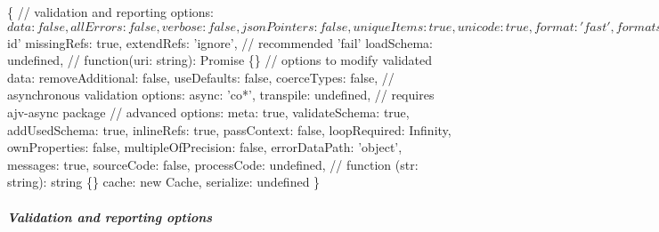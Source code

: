 \begin{DoxyCode}
\{
  // validation and reporting options:
  $data:            false,
  allErrors:        false,
  verbose:          false,
  jsonPointers:     false,
  uniqueItems:      true,
  unicode:          true,
  format:           'fast',
  formats:          \{\},
  unknownFormats:   true,
  schemas:          \{\},
  // referenced schema options:
  schemaId:         undefined // recommended '$id'
  missingRefs:      true,
  extendRefs:       'ignore', // recommended 'fail'
  loadSchema:       undefined, // function(uri: string): Promise \{\}
  // options to modify validated data:
  removeAdditional: false,
  useDefaults:      false,
  coerceTypes:      false,
  // asynchronous validation options:
  async:            'co*',
  transpile:        undefined, // requires ajv-async package
  // advanced options:
  meta:             true,
  validateSchema:   true,
  addUsedSchema:    true,
  inlineRefs:       true,
  passContext:      false,
  loopRequired:     Infinity,
  ownProperties:    false,
  multipleOfPrecision: false,
  errorDataPath:    'object',
  messages:         true,
  sourceCode:       false,
  processCode:      undefined, // function (str: string): string \{\}
  cache:            new Cache,
  serialize:        undefined
\}
\end{DoxyCode}


\subparagraph*{Validation and reporting options}


